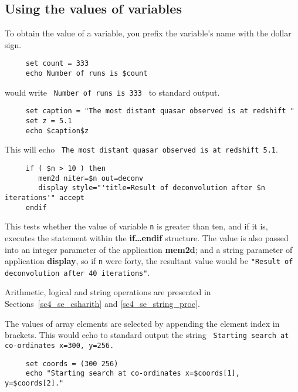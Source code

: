 \documentclass[twoside,11pt]{article}
\newcommand{\htmlref}[2]{#1}
\newcommand{\xref}[3]{#1}
\newcommand{\xlabel}[1]{}
\newcommand{\latexelsehtml}[2]{#1}
\newcommand{\latexelsehtml}[2]{#2}
\begin{document}
\subsection{\xlabel{sc4_se_values}Using the values of variables
\label{sc4_se_values}}

To obtain the value of a variable, you prefix the variable's name with
the dollar sign.

\small
\begin{verbatim}
     set count = 333
     echo Number of runs is $count
\end{verbatim}
\normalsize
would write ~{\tt Number of runs is 333}~ to \htmlref{{\sf standard
output}}{sc4_gl_std_out}.

\small
\begin{verbatim}
     set caption = "The most distant quasar observed is at redshift "
     set z = 5.1
     echo $caption$z
\end{verbatim}
\normalsize
This will echo ~{\tt The most distant quasar observed is at redshift 5.1}.

\small
\begin{verbatim}
     if ( $n > 10 ) then
        mem2d niter=$n out=deconv
        display style="'title=Result of deconvolution after $n iterations'" accept
     endif
\end{verbatim}
\normalsize
This tests whether the value of variable {\tt n} is greater than ten, and
if it is, executes the statement within the {\bf if\ldots endif}
structure.  The value is also passed into an integer parameter of the
application \xref{{\bf mem2d}}{sun95}{MEM2D}; and a string parameter of application 
\xref{{\bf display}}{sun95}{DISPLAY}, so if {\tt n} were forty, the resultant value would
be {\tt "Result of deconvolution after 40 iterations"}.

Arithmetic, logical and string operations are presented in
\latexelsehtml{Sections~\ref{sc4_se_csharith} and \ref{sc4_se_string_proc}.
}{
\htmlref{Arithmetic}{sc4_se_csharith} and
\htmlref{String Processing}{sc4_se_string_proc}.}

The values of array elements are selected by appending the element
index in brackets.  This would echo to \htmlref{{\sf standard
output}}{sc4_gl_std_out} the string ~{\tt Starting search at
co-ordinates x=300, y=256.}

\small
\begin{verbatim}
     set coords = (300 256)
     echo "Starting search at co-ordinates x=$coords[1], y=$coords[2]."
\end{verbatim}
\normalsize
\end{document}
